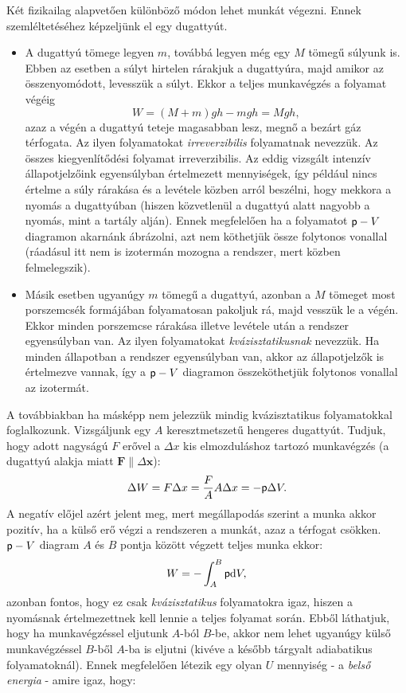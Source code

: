 Két fizikailag alapvetően különböző módon lehet munkát végezni. Ennek szemléltetéséhez képzeljünk el egy dugattyút.
\begin{itemize}
    \item A dugattyú tömege legyen $m$, továbbá legyen még egy $M$ tömegű súlyunk is. Ebben az esetben a súlyt hirtelen rárakjuk a dugattyúra, majd amikor az összenyomódott, levesszük a súlyt. Ekkor a teljes munkavégzés a folyamat végéig $$W=(M+m)gh-mgh = Mgh,$$ azaz a végén a dugattyú teteje magasabban lesz, megnő a bezárt gáz térfogata. Az ilyen folyamatokat \emph{irreverzibilis} folyamatnak nevezzük. Az összes kiegyenlítődési folyamat irreverzibilis. Az eddig vizsgált intenzív állapotjelzőink egyensúlyban értelmezett mennyiségek, így például nincs értelme a súly rárakása és a levétele közben arról beszélni, hogy mekkora a nyomás a dugattyúban (hiszen közvetlenül a dugattyú alatt nagyobb a nyomás, mint a tartály alján). Ennek megfelelően ha a folyamatot $\mathsf p-V$ diagramon akarnánk ábrázolni, azt nem köthetjük össze folytonos vonallal (ráadásul itt nem is izotermán mozogna a rendszer, mert közben felmelegszik).
    \item Másik esetben ugyanúgy $m$ tömegű a dugattyú, azonban a $M$ tömeget most porszemcsék formájában folyamatosan pakoljuk rá, majd vesszük le a végén. Ekkor minden porszemcse rárakása illetve levétele után a rendszer egyensúlyban van. Az ilyen folyamatokat \emph{kvázisztatikusnak} nevezzük. Ha minden állapotban a rendszer egyensúlyban van, akkor az állapotjelzők is értelmezve vannak, így a $\mathsf p-V$ diagramon összeköthetjük folytonos vonallal az izotermát.
\end{itemize}
A továbbiakban ha másképp nem jelezzük mindig kvázisztatikus folyamatokkal foglalkozunk. Vizsgáljunk egy $A$ keresztmetszetű hengeres dugattyút. Tudjuk, hogy adott nagyságú $F$ erővel a $\Delta x$ kis elmozduláshoz tartozó munkavégzés (a dugattyú alakja miatt $\bm F \parallel \Delta \bm x$):
\begin{align}
    \Delta W = F\Delta x = \frac FA A\Delta x = -\mathsf p\Delta V.
\end{align}
A negatív előjel azért jelent meg, mert megállapodás szerint a munka akkor pozitív, ha a külső erő végzi a rendszeren a munkát, azaz a térfogat csökken. $\mathsf p-V$ diagram $A$ és $B$ pontja között végzett teljes munka ekkor:
\begin{align}
    W = -\int_A^B \mathsf p\mathrm{d}V,
\end{align}
azonban fontos, hogy ez csak \emph{kvázisztatikus} folyamatokra igaz, hiszen a nyomásnak értelmezettnek kell lennie a teljes folyamat során. Ebből láthatjuk, hogy ha munkavégzéssel eljutunk $A$-ból $B$-be, akkor nem lehet ugyanúgy külső munkavégzéssel $B$-ből $A$-ba is eljutni (kivéve a később tárgyalt adiabatikus folyamatoknál). Ennek megfelelően létezik egy olyan $U$ mennyiség - a \emph{belső energia} - amire igaz, hogy:

